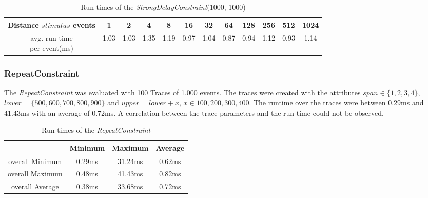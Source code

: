 	\begin{table}	
		\begin{tabular}{|c|c|c|c|c|c|c|c|c|c|c|c|}
			\hline 
			\makecell{Distance\\$stimulus$\\events}  & 	1	 & 2 	  & 4 	   & 8 	   & 16 	& 32 	 & 64 	  & 128    & 256 	& 512 	& 1024\\
			\hline
			\makecell{avg. run time\\per event(ms)}	& 1.03 & 1.03 & 1.35 & 1.19 & 0.97 & 1.04 & 0.87 & 0.94 & 1.12 & 0.93 & 1.14\\
			\hline
		\end{tabular}
		\centering
		\caption{Run times of the \textit{StrongDelayConstraint}(1000, 1000)}
		\label{tab:runtimeStrongDelay}
	\end{table}

\subsubsection{RepeatConstraint}
	The \textit{RepeatConstraint} was evaluated with 100 Traces of 1.000 events. The traces were created with the attributes $span\in\{1,2,3,4\}$, $lower=\{500,600,700,800,900\}$ and $upper=lower+x$, $x\in{100,200,300,400}$. The  runtime over the traces were between 0.29ms and 41.43ms with an average of 0.72ms. A correlation between the trace parameters and the run time could not be observed.
	
	\begin{table}
		\begin{tabular}{|c|c|c|c|}
			\hline
							& Minimum &  Maximum &  Average \\
			\hline
			overall Minimum & 0.29ms & 31.24ms & 0.62ms\\
			\hline
			overall Maximum & 0.48ms & 41.43ms & 0.82ms\\
			\hline
			overall Average & 0.38ms & 33.68ms & 0.72ms\\
			\hline
		\end{tabular}
		\centering
		\caption{Run times of the \textit{RepeatConstraint}}
		\label{tab:runtimeRepeat}
	\end{table}

